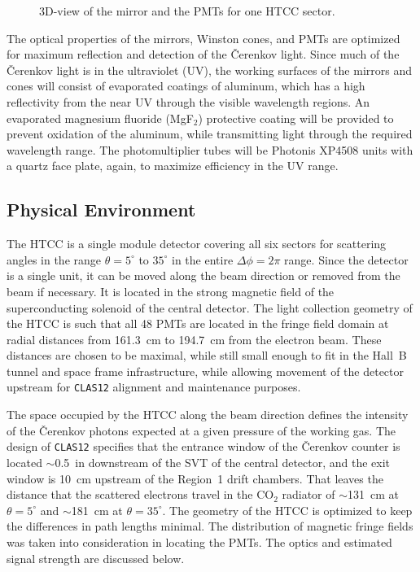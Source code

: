 \begin{figure}
\begin{center}
\caption{\small{3D-view of the mirror and the PMTs for one HTCC sector.}}
\label{3dview}
\end{center}
\end{figure}

The optical properties of the mirrors, Winston cones, and PMTs are 
optimized for maximum reflection and detection of the {\v C}erenkov 
light.  Since much of the {\v C}erenkov light is in the ultraviolet (UV), 
the working surfaces of the mirrors and cones will consist of evaporated
coatings of aluminum, which has a high reflectivity from the near UV 
through the visible wavelength regions.  An evaporated magnesium fluoride 
(MgF$_2$) protective coating will be provided to prevent oxidation of the 
aluminum, while transmitting light through the required wavelength range. 
The photomultiplier tubes will be Photonis XP4508 units with a quartz 
face plate, again, to maximize efficiency in the UV range. 
 
\subsection{Physical Environment} 
\label{Physical Environment}

The HTCC is a single module detector covering all six sectors for scattering 
angles in the range $\theta = 5^\circ$ to $35^\circ$ in the entire 
$\Delta \phi = 2\pi$ range.  Since the detector is a single unit, it can be 
moved along the beam direction or removed from the beam if necessary.  It is 
located in the strong magnetic field of the superconducting solenoid of the 
central detector.  The light collection geometry of the HTCC is such that all 
48 PMTs are located in the fringe field domain at radial distances from
161.3~cm to 194.7~cm from the electron beam.  These distances are chosen to be 
maximal, while still small enough to fit in the Hall~B tunnel and space 
frame infrastructure, while allowing movement of the detector upstream for 
{\tt CLAS12} alignment and maintenance purposes.

The space occupied by the HTCC along the beam direction defines the 
intensity of the {\v C}erenkov photons expected at a given pressure of the 
working gas.  The design of {\tt CLAS12} specifies that the entrance window 
of the {\v C}erenkov counter is located $\sim$0.5~in downstream of the SVT 
of the central detector, and the exit window is 10~cm upstream of the Region~1 
drift chambers.  That leaves the distance that the scattered electrons travel 
in the CO$_2$ radiator of $\sim$131~cm at $\theta = 5^\circ$ and $\sim$181~cm 
at $\theta = 35^\circ$.  The geometry of the HTCC is optimized to keep the
differences in path lengths minimal.  The distribution of magnetic fringe 
fields was taken into consideration in locating the PMTs.  The optics and
estimated signal strength are discussed below.

